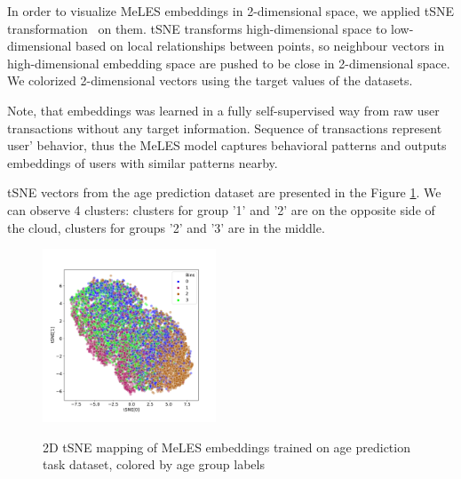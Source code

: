 \documentclass[sigconf, anonymous]{acmart}
\begin{document}
In order to visualize MeLES embeddings in 2-dimensional space, we applied tSNE transformation~\cite{maaten2008visualizing} on them. tSNE transforms high-dimensional space to low-dimensional based on local relationships between points, so neighbour vectors in high-dimensional embedding space are pushed to be close in 2-dimensional space. We colorized 2-dimensional vectors using the target values of the datasets.

Note, that embeddings was learned in a fully self-supervised way from raw user transactions without any target information. Sequence of transactions represent user' behavior, thus the MeLES model captures behavioral patterns and outputs embeddings of users with similar patterns nearby.

tSNE vectors from the age prediction dataset are presented in the Figure \ref{fig-tsne-age}. We can observe 4 clusters: clusters for group '1' and '2' are on the opposite side of the cloud, clusters for groups '2' and '3' are in the middle.



\begin{figure}[ht]
  \caption{2D tSNE mapping of MeLES embeddings trained on age prediction task dataset, colored by age group labels}
  \includegraphics[width=0.46\textwidth]{figures/age-pred-tsne.pdf}
  \label{fig-tsne-age}
\end{figure}
\end{document}
